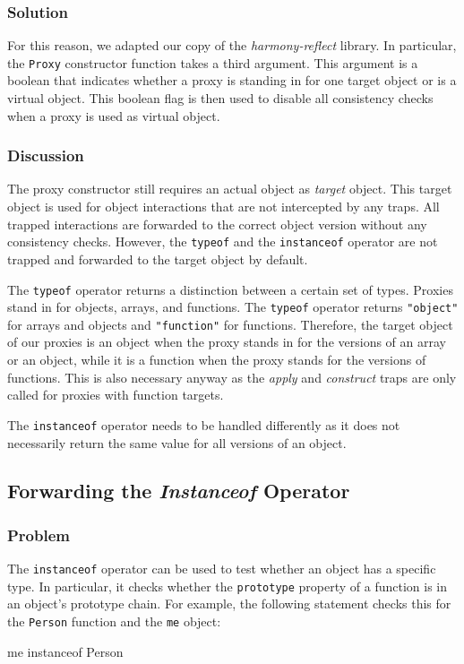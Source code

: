 \subsubsection{Solution}
For this reason, we adapted our copy of the \emph{harmony-reflect} library.
In particular, the \lstinline{Proxy} constructor function takes a third argument.
This argument is a boolean that indicates whether a proxy is standing in for one target object or is a virtual object.
This boolean flag is then used to disable all consistency checks when a proxy is used as virtual object.


\subsubsection{Discussion}

The proxy constructor still requires an actual object as \emph{target} object.
This target object is used for object interactions that are not intercepted by any traps.
All trapped interactions are forwarded to the correct object version without any consistency checks.
However, the \lstinline{typeof} and the \lstinline{instanceof} operator are not trapped and forwarded to the target object by default.

The \lstinline{typeof} operator returns a distinction between a certain set of types.
Proxies stand in for objects, arrays, and functions.
The \lstinline{typeof} operator returns \lstinline{"object"} for arrays and objects and \lstinline{"function"} for functions.
Therefore, the target object of our proxies is an object when the proxy stands in for the versions of an array or an object, while it is a function when the proxy stands for the versions of functions.
This is also necessary anyway as the \emph{apply} and \emph{construct} traps are only called for proxies with function targets.

The \lstinline{instanceof} operator needs to be handled differently as it does not necessarily return the same value for all versions of an object.


\subsection{Forwarding the \emph{Instanceof} Operator}

\subsubsection{Problem}

The \lstinline{instanceof} operator can be used to test whether an object has a specific type.
In particular, it checks whether the \lstinline{prototype} property of a function is in an object's prototype chain.
For example, the following statement checks this for the \lstinline{Person} function and the \lstinline{me} object:

\begin{code}{}{}
me instanceof Person
\end{code}
\iffalse
\end{verbatim}\fi

